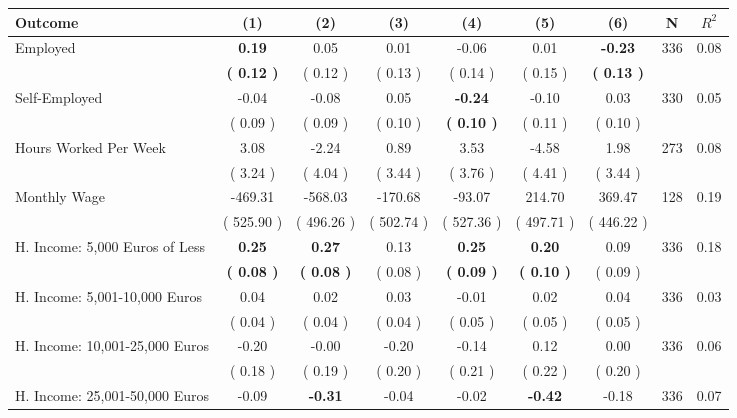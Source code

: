 \begin{tabular}{lcccccccc}
\toprule
 \textbf{Outcome} & \textbf{(1)} & \textbf{(2)} & \textbf{(3)} & \textbf{(4)} & \textbf{(5)} & \textbf{(6)} & \textbf{N} & \textbf{$ R^2$} \\
\midrule
Employed & \textbf{     0.19} &      0.05 &      0.01 &     -0.06 &      0.01 & \textbf{    -0.23} & 336 &       0.08 \\ 
 & \textbf{(     0.12 )} & (     0.12 ) & (     0.13 ) & (     0.14 ) & (     0.15 ) & \textbf{(     0.13 )} & \\
Self-Employed &     -0.04 &     -0.08 &      0.05 & \textbf{    -0.24} &     -0.10 &      0.03 & 330 &       0.05 \\ 
 & (     0.09 ) & (     0.09 ) & (     0.10 ) & \textbf{(     0.10 )} & (     0.11 ) & (     0.10 ) & \\
Hours Worked Per Week &      3.08 &     -2.24 &      0.89 &      3.53 &     -4.58 &      1.98 & 273 &       0.08 \\ 
 & (     3.24 ) & (     4.04 ) & (     3.44 ) & (     3.76 ) & (     4.41 ) & (     3.44 ) & \\
Monthly Wage &   -469.31 &   -568.03 &   -170.68 &    -93.07 &    214.70 &    369.47 & 128 &       0.19 \\ 
 & (   525.90 ) & (   496.26 ) & (   502.74 ) & (   527.36 ) & (   497.71 ) & (   446.22 ) & \\
H. Income: 5,000 Euros of Less & \textbf{     0.25} & \textbf{     0.27} &      0.13 & \textbf{     0.25} & \textbf{     0.20} &      0.09 & 336 &       0.18 \\ 
 & \textbf{(     0.08 )} & \textbf{(     0.08 )} & (     0.08 ) & \textbf{(     0.09 )} & \textbf{(     0.10 )} & (     0.09 ) & \\
H. Income: 5,001-10,000 Euros &      0.04 &      0.02 &      0.03 &     -0.01 &      0.02 &      0.04 & 336 &       0.03 \\ 
 & (     0.04 ) & (     0.04 ) & (     0.04 ) & (     0.05 ) & (     0.05 ) & (     0.05 ) & \\
H. Income: 10,001-25,000 Euros &     -0.20 &     -0.00 &     -0.20 &     -0.14 &      0.12 &      0.00 & 336 &       0.06 \\ 
 & (     0.18 ) & (     0.19 ) & (     0.20 ) & (     0.21 ) & (     0.22 ) & (     0.20 ) & \\
H. Income: 25,001-50,000 Euros &     -0.09 & \textbf{    -0.31} &     -0.04 &     -0.02 & \textbf{    -0.42} &     -0.18 & 336 &       0.07 \\ 

\end{tabular}
